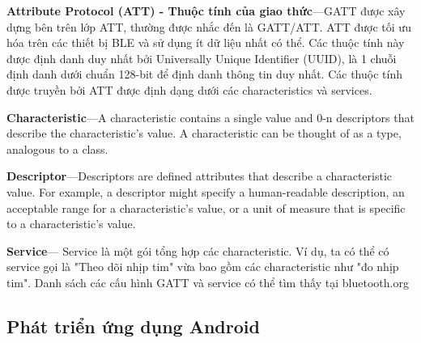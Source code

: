 \textbf{Attribute Protocol (ATT) - Thuộc tính của giao thức}—GATT được xây dựng bên trên lớp ATT, thường được nhắc đến là GATT/ATT. ATT được tối ưu hóa trên các thiết bị BLE và sử dụng ít dữ liệu nhất có thể. Các thuộc tính này được định danh duy nhất bởi Universally Unique Identifier (UUID), là 1 chuỗi định danh dưới chuẩn 128-bit để định danh thông tin duy nhất. Các thuộc tính được truyền bởi ATT được định dạng dưới các characteristics và services.

\textbf{Characteristic}—A characteristic contains a single value and 0-n descriptors that describe the characteristic's value. A characteristic can be thought of as a type, analogous to a class. 

\textbf{Descriptor}—Descriptors are defined attributes that describe a characteristic value. For example, a descriptor might specify a human-readable description, an acceptable range for a characteristic's value, or a unit of measure that is specific to a characteristic's value.

\textbf{Service}— Service là một gói tổng hợp các characteristic. Ví dụ, ta có thể có service gọi là "Theo dõi nhịp tim" vừa bao gồm các characteristic như "đo nhịp tim". Danh sách các cấu hình GATT và service có thể tìm thấy tại bluetooth.org

\subsection{Phát triển ứng dụng Android}
